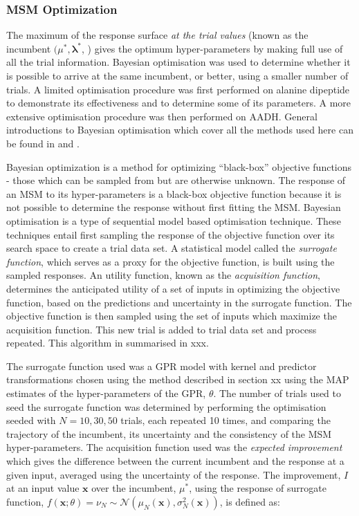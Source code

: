 \subsubsection{MSM Optimization}\label{subsec:meth_opt}
The maximum of the response surface \emph{at the trial values} (known as the incumbent $(\mu^{*}, \mathbf{\lambda}^{*}$, \cite{shahriariTakingHumanOut2016}) gives the optimum hyper-parameters  by making full use of all the trial information. Bayesian optimisation was used to determine whether it is possible to arrive at the same incumbent, or better, using a smaller number of trials. A limited optimisation procedure was first performed on alanine dipeptide to demonstrate its effectiveness and to determine some of its parameters. A more extensive optimisation procedure was then performed on AADH. General introductions to Bayesian optimisation which cover all the methods used here can be found in \cite{NIPS2012_4522} and \cite{shahriariTakingHumanOut2016}. 

Bayesian optimization is a method for optimizing ``black-box'' objective functions - those which can be sampled from but are otherwise unknown. The response of an MSM to its hyper-parameters is a black-box objective function because it is not possible to determine the response without first fitting the MSM. Bayesian optimisation is a type of sequential model based \cite{hutterSequentialModelbasedOptimization2011} optimisation technique. These techniques entail first sampling the response of the objective function over its search space to create a trial data set. A statistical model called the \emph{surrogate function}, which serves as a proxy for the objective function, is built using the sampled responses. An utility function, known as the \emph{acquisition function}, determines the anticipated utility of a set of inputs in optimizing the objective function, based on the predictions and uncertainty in the surrogate function.  The objective function is then sampled using the set of inputs which maximize the acquisition function. This new trial is added to trial data set and process repeated. This algorithm in summarised in xxx. 

The surrogate function used was a GPR model with kernel and predictor transformations chosen using the method described in section xx using the MAP estimates of the hyper-parameters of the GPR, $\theta$. The number of trials used to seed the surrogate function was determined by performing the optimisation seeded with $N=10, 30, 50$ trials, each repeated 10 times, and comparing the trajectory of the incumbent, its uncertainty and the consistency of the MSM hyper-parameters. The acquisition function used was the \emph{expected improvement} which gives the difference between the current incumbent and the  response at a given input, averaged using the uncertainty of the response. The improvement, $I$ at an input value $\mathbf{x}$ over the incumbent, $\mu^{*}$, using the response of surrogate function, $f(\mathbf{x}; \theta) = \nu_{N} \sim \mathcal{N}(\mu_{N}(\mathbf{x}), \sigma_N^{2}(\mathbf{x}))$, is defined as: 

